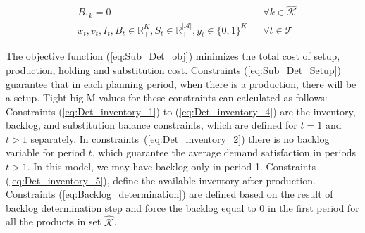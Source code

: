 \documentclass[11pt]{article}
\newcommand{\ti}{t} %
\newcommand{\TI}{\mathcal{T}}
\newcommand{\Ti}{T}
\newcommand{\ka}{k} %
\newcommand{\KA}{\mathcal{K}}
\newcommand{\Ka}{K}
\newcommand{\jey}{j} %
\newcommand{\Graf}{\mathcal{A}} %
\newcommand{\Bi}{B} %
\newcommand{\Csub}{\mathcal{K}^+_k}
\newcommand{\cred}{\color{black}}
\begin{document}
\begin{subequations}
\begin{alignat}{2}
&\Bi_{1 \ka} =0 &&\forall  \ka \in \hat{\KA} \label{eq:Backlog_determination}\\
&  {x}_{ \ti },  {v}_{ \ti },  {I}_{ \ti} , {\Bi}_{ \ti } \in \mathbb{R}_{+}^{\Ka} , {S}_{\ti} \in \mathbb{R}_{+}^{|\Graf|} ,{y}_{ \ti } \in \{0,1\}^{\Ka} &&\forall \ti \in \TI  \label{eq:Sub_FD_bound2}
\end{alignat}
\end{subequations}

The objective function (\ref{eq:Sub_Det_obj}) minimizes the total cost of setup, production, holding and substitution cost. Constraints (\ref{eq:Sub_Det_Setup}) guarantee that in each planning period, when there is a production, there will be a setup. Tight big-M values for these constraints can calculated as follows:
{\cred{
\begin{alignat}{2}
  &  M_{\ti \ka} =  \sum_{\jey \in  \Csub}\left( \hat{B}_{0 \jey}+ {\hat{D}}_{1 \jey} + \sum_{\ti = 2 }^\Ti \mathbb{E}[{D}_{\ti \jey}]\right)  &&\qquad \forall \ti \in \TI ,\forall \ka \in \KA   
  \label{eq:BigM_Deterministic_Appr}
  \end{alignat}}}
Constraints (\ref{eq:Det_inventory_1}) to (\ref{eq:Det_inventory_4}) are the inventory, backlog, and substitution balance constraints, which are defined for $\ti=1$ and $\ti > 1$ separately.
In constraints~(\ref{eq:Det_inventory_2}) there is no backlog variable for period $\ti$, which guarantee the average demand satisfaction in periods $\ti > 1$. In this model, we may have backlog only in period 1. 
Constraints (\ref{eq:Det_inventory_5}), define the available inventory after production. %
Constraints (\ref{eq:Backlog_determination}) are defined based on the result of backlog determination step and force the backlog equal to 0 in the first period for all the products in set $\hat{\KA}$.
\end{document}
